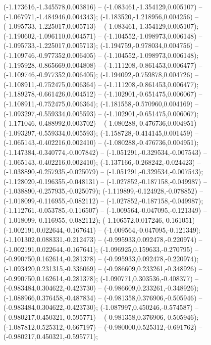  (-1.173616,-1.345578,0.003816) -- (-1.083461,-1.354129,0.005107) -- (-1.067971,-1.484946,0.004343);
 (-1.183520,-1.218956,0.004256) -- (-1.095733,-1.225017,0.005713) -- (-1.083461,-1.354129,0.005107);
 (-1.190602,-1.096110,0.004571) -- (-1.104552,-1.098973,0.006148) -- (-1.095733,-1.225017,0.005713);
 (-1.194759,-0.978034,0.004756) -- (-1.109746,-0.977352,0.006405) -- (-1.104552,-1.098973,0.006148);
 (-1.195928,-0.865669,0.004808) -- (-1.111208,-0.861453,0.006477) -- (-1.109746,-0.977352,0.006405);
 (-1.194092,-0.759878,0.004726) -- (-1.108911,-0.752475,0.006364) -- (-1.111208,-0.861453,0.006477);
 (-1.189278,-0.661426,0.004512) -- (-1.102901,-0.651475,0.006067) -- (-1.108911,-0.752475,0.006364);
 (-1.181558,-0.570960,0.004169) -- (-1.093297,-0.559334,0.005593) -- (-1.102901,-0.651475,0.006067);
 (-1.171046,-0.488992,0.003702) -- (-1.080288,-0.476736,0.004951) -- (-1.093297,-0.559334,0.005593);
 (-1.158728,-0.414145,0.001459) -- (-1.065143,-0.402216,0.002410) -- (-1.080288,-0.476736,0.004951);
 (-1.147384,-0.340774,-0.007842) -- (-1.051291,-0.329534,-0.007543) -- (-1.065143,-0.402216,0.002410);
 (-1.137166,-0.268242,-0.024423) -- (-1.038890,-0.257935,-0.025079) -- (-1.051291,-0.329534,-0.007543);
 (-1.128020,-0.196355,-0.048131) -- (-1.027852,-0.187158,-0.049987) -- (-1.038890,-0.257935,-0.025079);
 (-1.119899,-0.124928,-0.078852) -- (-1.018099,-0.116955,-0.082112) -- (-1.027852,-0.187158,-0.049987);
 (-1.112761,-0.053785,-0.116507) -- (-1.009564,-0.047095,-0.121349) -- (-1.018099,-0.116955,-0.082112);
 (-1.106572,0.017246,-0.161051) -- (-1.002191,0.022644,-0.167641) -- (-1.009564,-0.047095,-0.121349);
 (-1.101302,0.088331,-0.212473) -- (-0.995933,0.092478,-0.220974) -- (-1.002191,0.022644,-0.167641);
 (-1.096925,0.159633,-0.270795) -- (-0.990750,0.162614,-0.281378) -- (-0.995933,0.092478,-0.220974);
 (-1.093420,0.231315,-0.336069) -- (-0.986609,0.233261,-0.348926) -- (-0.990750,0.162614,-0.281378);
 (-1.090771,0.303536,-0.408377) -- (-0.983484,0.304622,-0.423730) -- (-0.986609,0.233261,-0.348926);
 (-1.088966,0.376458,-0.487834) -- (-0.981358,0.376906,-0.505946) -- (-0.983484,0.304622,-0.423730);
 (-1.087997,0.450246,-0.574587) -- (-0.980217,0.450321,-0.595771) -- (-0.981358,0.376906,-0.505946);
 (-1.087812,0.525312,-0.667197) -- (-0.980000,0.525312,-0.691762) -- (-0.980217,0.450321,-0.595771);

